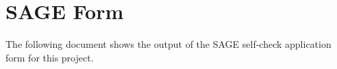 \chapter{SAGE Form}
\label{app:sage}
The following document shows the output of the SAGE self-check application form for this project.

